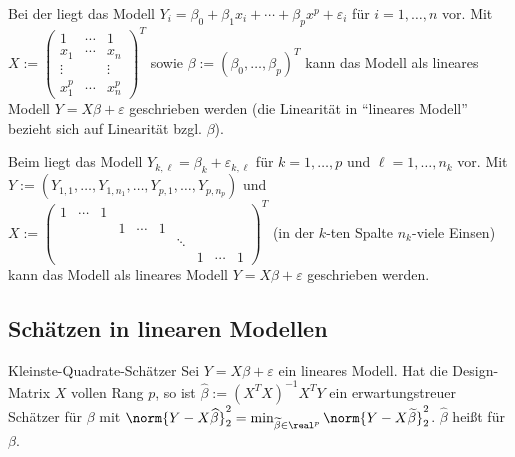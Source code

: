 \linie

\begin{Bsp}
    Bei der  liegt das Modell
    $Y_i = \beta_0 + \beta_1 x_i + \dotsb + \beta_p x^p + \varepsilon_i$
    für $i = 1, \dotsc, n$ vor.
    Mit $X := \begin{pmatrix}1 & \cdots & 1\\x_1 & \cdots & x_n\\\vdots && \vdots\\
    x_1^p & \dotsb & x_n^p\end{pmatrix}^T$
    sowie $\beta := (\beta_0, \dotsc, \beta_p)^T$
    kann das Modell als lineares Modell $Y = X\beta + \varepsilon$ geschrieben werden
    (die Linearität in "`lineares Modell"' bezieht sich auf Linearität bzgl. $\beta$).
\end{Bsp}

\linie
\pagebreak

\begin{Bsp}
    Beim  liegt das Modell
    $Y_{k,\ell} = \beta_k + \varepsilon_{k,\ell}$ für $k = 1, \dotsc, p$ und
    $\ell = 1, \dotsc, n_k$ vor.
    Mit $Y := (Y_{1,1}, \dotsc, Y_{1,n_1}, \dotsc, Y_{p,1}, \dotsc, Y_{p,n_p})$ und\\
    $X := \begin{pmatrix}1 & \cdots & 1 &&&&&&&\\&&& 1 & \cdots & 1
    &&&&\\&&&&&& \ddots &&&\\&&&&&&& 1 & \cdots & 1\end{pmatrix}^T$
    (in der $k$-ten Spalte $n_k$-viele Einsen)
    kann das Modell als lineares Modell $Y = X\beta + \varepsilon$ geschrieben werden.
\end{Bsp}

\subsection{%
    Schätzen in linearen Modellen%
}

\begin{Satz}{Kleinste-Quadrate-Schätzer}
    Sei $Y = X\beta + \varepsilon$ ein lineares Modell.
    Hat die Design-Matrix $X$ vollen Rang $p$, so ist
    $\widehat{\beta} := (X^T X)^{-1} X^T Y$
    ein erwartungstreuer Schätzer für $\beta$ mit
    $\norm{Y - X\widehat{\beta}}_2^2 = \min_{\widetilde{\beta} \in \real^p}
    \norm{Y - X\widetilde{\beta}}_2^2$.
    $\widehat{\beta}$ heißt  für $\beta$.
\end{Satz}

\pagebreak
